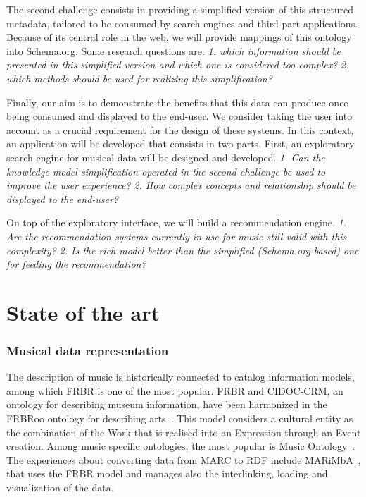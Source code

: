 \documentclass{llncs}
\begin{document}
The second challenge consists in providing a simplified version of this structured metadata, tailored to be consumed by search engines and third-part applications. Because of its central role in the web, we will provide mappings of this ontology into Schema.org. Some research questions are:
\textit{1. which information should be presented in this simplified version and which one is considered too complex?}
\textit{2. which methods should be used for realizing this simplification?}

Finally, our aim is to demonstrate the benefits that this data can produce once being consumed and displayed to the end-user. We consider taking the user into account as a crucial requirement for the design of these systems. In this context, an application will be developed that consists in two parts. First, an exploratory search engine for musical data will be designed and developed.
\textit{1. Can the knowledge model simplification operated in the second challenge be used to improve the user experience?}
\textit{2. How complex concepts and relationship should be displayed to the end-user?}

On top of the exploratory interface, we will build a recommendation engine.
\textit{1. Are the recommendation systems currently in-use for music still valid with this complexity?}
\textit{2. Is the rich model better than the simplified (Schema.org-based) one for feeding the recommendation?}


\section{State of the art}
\label{sec:state-art}

\subsubsection*{Musical data representation}
The description of music is historically connected to catalog information models, among which FRBR is one of the most popular. FRBR and CIDOC-CRM, an ontology for describing museum information, have been harmonized in the FRBRoo ontology for describing arts~\cite{doerr2008frbroo}. This model considers a cultural entity as the combination of the Work that is realised into an Expression through an Event creation. Among music specific ontologies, the most popular is Music Ontology~\cite{raimond2007music}. The experiences about converting data from MARC to RDF include MARiMbA~\cite{greenberg2013datos}, that uses the FRBR model and manages also  the interlinking, loading and visualization of the data.
\end{document}
